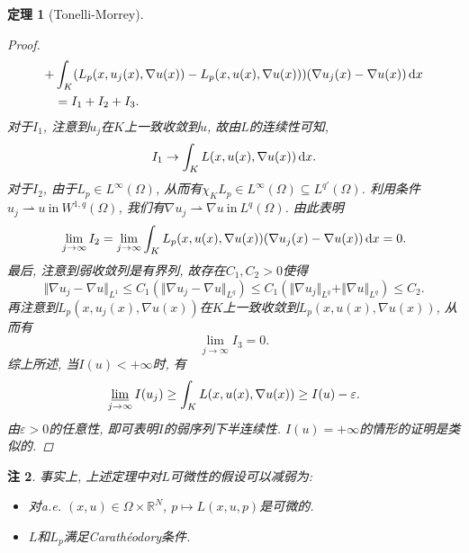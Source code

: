 \documentclass[12pt,a4paper]{article}
\newtheorem{theorem}{定理}[section]
\newtheorem{remark}[theorem]{注}
\begin{document}
\begin{theorem}[Tonelli-Morrey]
\begin{proof}
\begin{align*}
            + &\int_K(L_p(x, u_j(x), \nabla u(x)) - L_p(x, u(x), \nabla u(x)))(\nabla u_j(x) - \nabla u(x)) \,{\rm d}x \\ 
            &= I_1 + I_2 + I_3.
        \end{align*}
        对于$I_1$, 注意到$u_j$在$K$上一致收敛到$u$, 故由$L$的连续性可知, 
        \begin{equation*}
            I_1 \rightarrow \int_KL(x, u(x), \nabla u(x)) \,{\rm d}x.
        \end{equation*}
        对于$I_2$, 由于$L_p \in L^{\infty}(\Omega)$, 从而有$\chi_KL_p \in L^{\infty}(\Omega) \subseteq L^{q'}(\Omega)$.
        利用条件$u_j \rightharpoonup u \ \text{in}\ W^{1, q}(\Omega)$, 我们有$\nabla u_j \rightharpoonup \nabla u\ \text{in}\ L^q(\Omega)$.
        由此表明 
        \begin{equation*}
            \lim\limits_{j \rightarrow \infty}I_2 = \lim\limits_{j \rightarrow \infty}\int_KL_p(x, u(x), \nabla u(x))(\nabla u_j(x) - \nabla u(x)) \,{\rm d}x = 0.
        \end{equation*}
        最后, 注意到弱收敛列是有界列, 故存在$C_1, C_2 > 0$使得 
        \begin{equation*}
            \Vert \nabla u_j - \nabla u\Vert_{L^1} \leq C_1(\Vert \nabla u_j - \nabla u\Vert_{L^q}) \leq C_1(\Vert \nabla u_j\Vert_{L^q} + \Vert \nabla u\Vert_{L^q}) \leq C_2.
        \end{equation*}
        再注意到$L_p(x, u_j(x), \nabla u(x))$在$K$上一致收敛到$L_p(x, u(x), \nabla u(x))$, 从而有 
        \begin{equation*}
            \lim\limits_{j \rightarrow \infty}I_3 = 0.
        \end{equation*}
        综上所述, 当$I(u) < +\infty$时, 有 
        \begin{equation*}
            \varliminf\limits_{j \rightarrow \infty}I(u_j) \geq \int_KL(x, u(x), \nabla u(x)) \geq I(u) - \varepsilon.
        \end{equation*}
        由$\varepsilon > 0$的任意性, 即可表明$I$的弱序列下半连续性. $I(u) = +\infty$的情形的证明是类似的.
    \end{proof}
\end{theorem}

\begin{remark}
    事实上, 上述定理中对$L$可微性的假设可以减弱为:
    \begin{itemize}
        \item 对a.e. $(x, u) \in \Omega \times \mathbb{R}^N$, $p \mapsto L(x, u, p)$是可微的.
        \item $L$和$L_p$满足Carathéodory条件.
    \end{itemize}
\end{remark}
\end{document}
